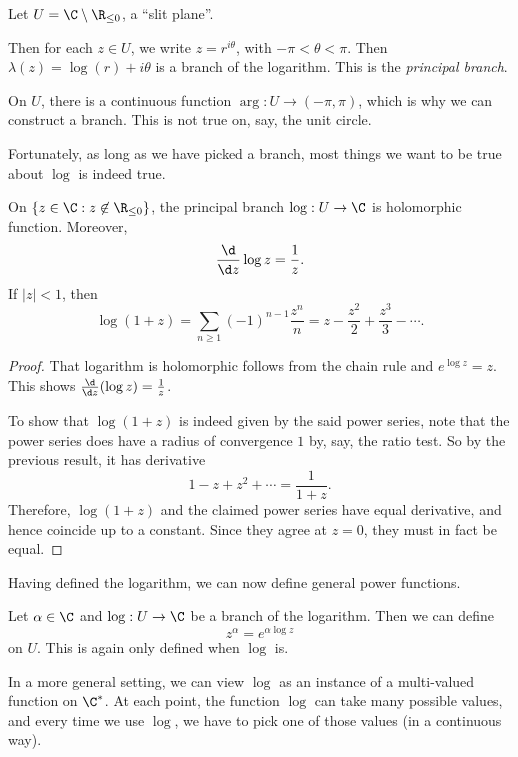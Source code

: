 \documentclass[a4paper]{article}
\begin{document}
\begin{eg}
  Let $U = \C\setminus \R_{\leq 0}$, a ``slit plane''.
  \begin{center}
  \end{center}
  Then for each $z \in U$, we write $z = r^{i \theta}$, with $-\pi < \theta < \pi$. Then $\lambda(z) = \log (r) + i \theta$ is a branch of the logarithm. This is the \emph{principal branch}.

  On $U$, there is a continuous function $\arg: U \to (-\pi, \pi)$, which is why we can construct a branch. This is not true on, say, the unit circle.
\end{eg}

Fortunately, as long as we have picked a branch, most things we want to be true about $\log$ is indeed true.
\begin{prop}
  On $\{z \in \C: z \not\in \R_{\leq 0}\}$, the principal branch $\log: U \to \C$ is holomorphic function. Moreover,
  \[
    \frac{\d}{\d z}\log z = \frac{1}{z}.
  \]
  If $|z| < 1$, then
  \[
    \log (1 + z) = \sum_{n \geq 1} (-1)^{n - 1} \frac{z^n}{n} = z - \frac{z^2}{2} + \frac{z^3}{3} - \cdots.
  \]
\end{prop}

\begin{proof}
  That logarithm is holomorphic follows from the chain rule and $e^{\log z} = z$. This shows $\frac{\d}{\d z} (\log z) = \frac{1}{z}$.

  To show that $\log(1 + z)$ is indeed given by the said power series, note that the power series does have a radius of convergence $1$ by, say, the ratio test. So by the previous result, it has derivative
  \[
    1 - z + z^2 + \cdots = \frac{1}{1 + z}.
  \]
  Therefore, $\log(1 + z)$ and the claimed power series have equal derivative, and hence coincide up to a constant. Since they agree at $z = 0$, they must in fact be equal.
\end{proof}
Having defined the logarithm, we can now define general power functions.

Let $\alpha \in \C$ and $\log: U \to \C$ be a branch of the logarithm. Then we can define
\[
  z^{\alpha} = e^{\alpha \log z}
\]
on $U$. This is again only defined when $\log$ is.

In a more general setting, we can view $\log$ as an instance of a multi-valued function on $\C^*$. At each point, the function $\log$ can take many possible values, and every time we use $\log$, we have to pick one of those values (in a continuous way).
\end{document}
